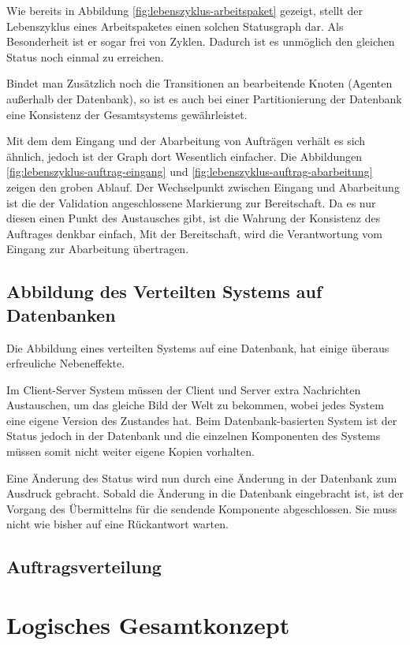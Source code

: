 Wie bereits in Abbildung \ref{fig:lebenszyklus-arbeitspaket} gezeigt,
stellt der Lebenszyklus eines Arbeitspaketes einen solchen Statusgraph dar.
Als Besonderheit ist er sogar frei von Zyklen.
Dadurch ist es unmöglich den gleichen Status noch einmal zu erreichen.

Bindet man Zusätzlich noch die Transitionen an bearbeitende Knoten (Agenten außerhalb der Datenbank),
so ist es auch bei einer Partitionierung der Datenbank eine Konsistenz der Gesamtsystems gewährleistet.



Mit dem dem Eingang und der Abarbeitung von Aufträgen verhält es sich ähnlich,
jedoch ist der Graph dort Wesentlich einfacher.
Die Abbildungen \ref{fig:lebenszyklus-auftrag-eingang} und \ref{fig:lebenszyklus-auftrag-abarbeitung} zeigen den groben Ablauf.
Der Wechselpunkt zwischen Eingang und Abarbeitung ist die der Validation angeschlossene Markierung zur Bereitschaft.
Da es nur diesen einen Punkt des Austausches gibt, ist die Wahrung der Konsistenz des Auftrages denkbar einfach,
Mit der Bereitschaft, wird die Verantwortung vom Eingang zur Abarbeitung übertragen.

\subsection{Abbildung des Verteilten Systems auf Datenbanken}

Die Abbildung eines verteilten Systems auf eine Datenbank,
hat einige überaus erfreuliche Nebeneffekte.

Im Client-Server System müssen der Client und Server extra Nachrichten Austauschen, um das gleiche Bild der Welt zu bekommen, wobei jedes System eine eigene Version des Zustandes hat.
Beim Datenbank-basierten System ist der Status jedoch in der Datenbank und
die einzelnen Komponenten des Systems müssen somit nicht weiter eigene Kopien vorhalten.

Eine Änderung des Status wird nun durch eine Änderung in der Datenbank zum Ausdruck gebracht.
Sobald die Änderung in die Datenbank eingebracht ist,
ist der Vorgang des Übermittelns für die sendende Komponente abgeschlossen.
Sie muss nicht wie bisher auf eine Rückantwort warten.

\subsection{Auftragsverteilung}

\section{Logisches Gesamtkonzept}
